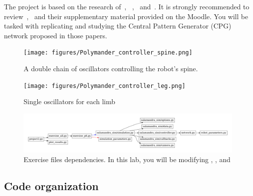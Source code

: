 \documentclass{cmc}
\begin{document}
The project is based on the research of~\cite{Crespi2013},
~\cite{Karakasiliotis2013},~\cite{ijspeert2007swimming}
and~\cite{thandiackal2021emergence}. It is strongly recommended to
review~\cite{ijspeert2007swimming},~\cite{thandiackal2021emergence} and their
supplementary material provided on the Moodle.
You will be tasked with replicating and studying the
Central Pattern Generator (CPG) network proposed in those papers.

\begin{figure}[H]
  \centering
  \texttt{[image: figures/Polymander\_controller\_spine.png]}
  \caption[Controller model spine]{A double chain of oscillators controlling
    the robot's spine.}\label{fig:controller-model-spine}
\end{figure}

\begin{figure}[H]
  \centering
  \texttt{[image: figures/Polymander\_controller\_leg.png]}
  \caption[Controller model limbs]{Single oscillators for each limb}
  \label{fig:controller-model-leg}
\end{figure}

\begin{figure}[ht]
  \centering \includegraphics[width=1.0\textwidth]{figures/files}
  \caption{\label{fig:files} Exercise files dependencies. In this lab, you will
    be modifying , ,
     and }
\end{figure}


\subsection*{Code organization}\label{subsec:code}
\end{document}
